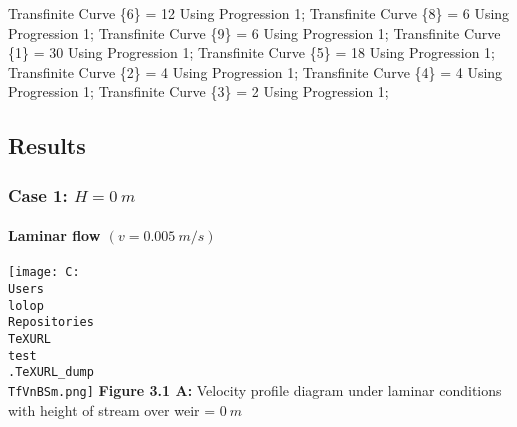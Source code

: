 \documentclass[11pt]{article}
\newenvironment{Shaded}{}{}
\newcommand{\DecValTok}[1]{\textcolor[rgb]{0.25,0.63,0.44}{{#1}}}
\newcommand{\NormalTok}[1]{{#1}}
\newcommand{\OperatorTok}[1]{\textcolor[rgb]{0.40,0.40,0.40}{{#1}}}
\begin{document}
\begin{Shaded}
\begin{Highlighting}[]
\NormalTok{Transfinite Curve }\OperatorTok{\{}\DecValTok{6}\OperatorTok{\}} \OperatorTok{=} \DecValTok{12}\NormalTok{ Using Progression }\DecValTok{1}\OperatorTok{;}
\NormalTok{Transfinite Curve }\OperatorTok{\{}\DecValTok{8}\OperatorTok{\}} \OperatorTok{=} \DecValTok{6}\NormalTok{ Using Progression }\DecValTok{1}\OperatorTok{;}
\NormalTok{Transfinite Curve }\OperatorTok{\{}\DecValTok{9}\OperatorTok{\}} \OperatorTok{=} \DecValTok{6}\NormalTok{ Using Progression }\DecValTok{1}\OperatorTok{;}
\NormalTok{Transfinite Curve }\OperatorTok{\{}\DecValTok{1}\OperatorTok{\}} \OperatorTok{=} \DecValTok{30}\NormalTok{ Using Progression }\DecValTok{1}\OperatorTok{;}
\NormalTok{Transfinite Curve }\OperatorTok{\{}\DecValTok{5}\OperatorTok{\}} \OperatorTok{=} \DecValTok{18}\NormalTok{ Using Progression }\DecValTok{1}\OperatorTok{;}
\NormalTok{Transfinite Curve }\OperatorTok{\{}\DecValTok{2}\OperatorTok{\}} \OperatorTok{=} \DecValTok{4}\NormalTok{ Using Progression }\DecValTok{1}\OperatorTok{;}
\NormalTok{Transfinite Curve }\OperatorTok{\{}\DecValTok{4}\OperatorTok{\}} \OperatorTok{=} \DecValTok{4}\NormalTok{ Using Progression }\DecValTok{1}\OperatorTok{;}
\NormalTok{Transfinite Curve }\OperatorTok{\{}\DecValTok{3}\OperatorTok{\}} \OperatorTok{=} \DecValTok{2}\NormalTok{ Using Progression }\DecValTok{1}\OperatorTok{;}
\end{Highlighting}
\end{Shaded}

\hypertarget{results}{%
\subsection{Results}\label{results}}

\hypertarget{case-1-h-0-m-1}{%
\subsubsection{\texorpdfstring{Case 1:
\(H = 0\ m\)}{Case 1: H = 0\textbackslash{} m}}\label{case-1-h-0-m-1}}

\hypertarget{laminar-flow-v-0.005-ms}{%
\paragraph{\texorpdfstring{Laminar flow
\((v = 0.005\ m/s)\)}{Laminar flow (v = 0.005\textbackslash{} m/s)}}\label{laminar-flow-v-0.005-ms}}

\texttt{[image: C:\\Users\\lolop\\Repositories\\TeXURL\\test\\.TeXURL\_dump\\TfVnBSm.png]} \textbf{Figure 3.1 A:}
Velocity profile diagram under laminar conditions with height of stream
over weir = \(0\ m\)
\end{document}
